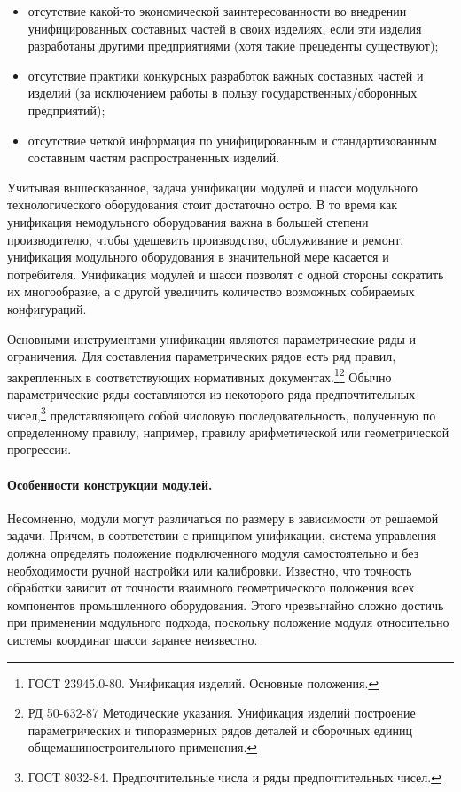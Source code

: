 \begin{itemize}
	\item отсутствие какой-то экономической заинтересованности во внедрении унифицированных составных частей в своих изделиях, если эти изделия разработаны другими предприятиями (хотя такие прецеденты существуют);
	\item отсутствие практики конкурсных разработок важных составных частей и изделий (за исключением работы в пользу государственных/оборонных предприятий);
	\item отсутствие четкой информация по унифицированным и стандартизованным составным частям распространенных изделий.
\end{itemize}

Учитывая вышесказанное, задача унификации модулей и шасси модульного технологического оборудования стоит достаточно остро. В то время как унификация немодульного оборудования важна в большей степени производителю, чтобы удешевить производство, обслуживание и ремонт, унификация модульного оборудования в значительной мере касается и потребителя. Унификация модулей и шасси позволят с одной стороны сократить их многообразие, а с другой увеличить количество возможных собираемых конфигураций. 

Основными инструментами унификации являются параметрические ряды и ограничения. Для составления параметрических рядов есть ряд правил, закрепленных в соответствующих нормативных документах.\footnote{ГОСТ 23945.0-80. Унификация изделий. Основные положения.}\footnote{РД 50-632-87 Методические указания. Унификация изделий построение параметрических и типоразмерных рядов деталей и сборочных единиц общемашиностроительного применения.} Обычно параметрические ряды составляются из некоторого ряда предпочтительных чисел,\footnote{ГОСТ 8032-84. Предпочтительные числа и ряды предпочтительных чисел.} представляющего собой числовую последовательность, полученную по определенному правилу, например, правилу арифметической или геометрической прогрессии.

\paragraph{Особенности конструкции модулей.}

Несомненно, модули могут различаться по размеру в зависимости от решаемой задачи. Причем, в соответствии с принципом унификации, система управления должна определять положение подключенного модуля самостоятельно и без необходимости ручной настройки или калибровки. Известно, что точность обработки зависит от точности взаимного геометрического положения всех компонентов промышленного оборудования. Этого чрезвычайно сложно достичь при применении модульного подхода, поскольку положение модуля относительно системы координат шасси заранее неизвестно.

